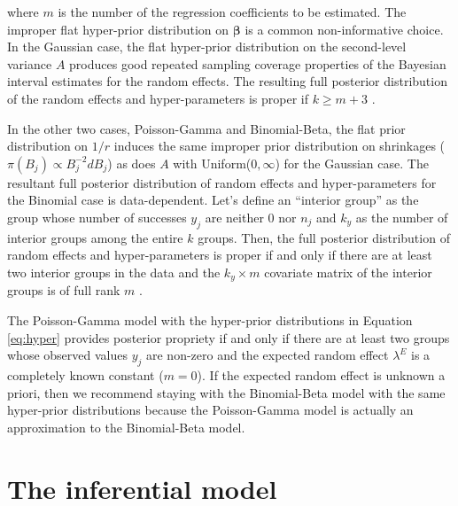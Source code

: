 \documentclass[article]{jss}
\begin{document}
where $m$ is the number of the regression coefficients to be estimated. The improper flat hyper-prior distribution on $\boldsymbol{\beta}$ is a common non-informative choice.  In the Gaussian case, the flat hyper-prior distribution on the second-level variance $A$ produces good repeated sampling coverage properties of the Bayesian interval estimates for the random effects. The resulting full posterior distribution of the random effects and hyper-parameters is proper if $k\ge m+3$ \citep{tang2011, kelly2014advances}. 


In the other two cases, Poisson-Gamma and Binomial-Beta, the flat prior distribution on $1/r$ induces the same improper prior distribution on shrinkages ($\pi(B_{j})\propto B_{j}^{-2} d B_j$) as does $A$ with Uniform($0, \infty$) for the Gaussian case. The resultant full posterior distribution of random effects and hyper-parameters for the Binomial case is data-dependent. Let's define an ``interior group'' as the group whose number of successes $y_j$ are neither 0 nor $n_j$ and $k_y$ as the number of interior groups among the entire $k$ groups. Then, the full posterior distribution of random effects and hyper-parameters is proper if and only if there are at least two interior groups in the data and the $k_y\times m$ covariate matrix of the interior groups is of full rank $m$ \citep{tak2016propriety}. 


The Poisson-Gamma model with the hyper-prior distributions in Equation \ref{eq:hyper} provides posterior propriety if and only if there are at least two groups whose observed values $y_j$ are non-zero  and the expected random effect $\lambda^E$ is a completely known constant ($m=0$). If the expected random effect is unknown a priori,  then we recommend staying with the Binomial-Beta model with the same hyper-prior distributions because the Poisson-Gamma model is actually an approximation to the Binomial-Beta model. 



\section[Inference]{The inferential model}\label{inference}
\end{document}
